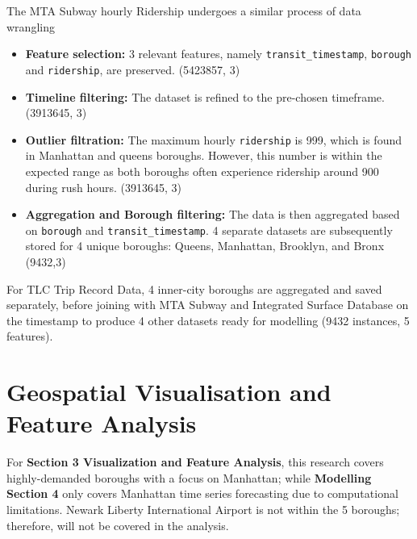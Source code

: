 \documentclass[11pt]{article}
\begin{document}
 The MTA Subway hourly Ridership undergoes a similar process of data wrangling

 \begin{itemize}
     \item \textbf{Feature selection:} 3 relevant features, namely \texttt{transit\_timestamp}, \texttt{borough} and \texttt{ridership}, are preserved. (5423857, 3) 
     \item \textbf{Timeline filtering:} The dataset is refined to the pre-chosen timeframe. (3913645, 3) 

     \item \textbf{Outlier filtration:} The maximum hourly \texttt{ridership} is 999, which is found in Manhattan and queens boroughs. However, this number is within the expected range as both boroughs often experience ridership around 900 during rush hours. (3913645, 3) 

     \item \textbf{Aggregation and Borough filtering:} The data is then aggregated based on \texttt{borough} and \texttt{transit\_timestamp}.  4 separate datasets are subsequently stored for 4 unique boroughs: Queens, Manhattan, Brooklyn, and Bronx (9432,3)

 \end{itemize}


 For TLC Trip Record Data, 4 inner-city boroughs are aggregated and saved separately, before joining with MTA Subway and Integrated Surface Database on the timestamp to produce 4 other datasets ready for modelling (9432 instances, 5 features).
 

\section{Geospatial Visualisation and Feature Analysis}
For \textbf{Section 3 Visualization and Feature Analysis}, this research covers highly-demanded boroughs with a focus on Manhattan; while \textbf{Modelling Section 4} only covers Manhattan time series forecasting due to computational limitations. 
Newark Liberty International Airport is not within the 5 boroughs; therefore, will not be covered in the analysis. 
\end{document}
